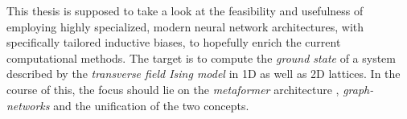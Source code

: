 This thesis is supposed to take a look at the feasibility and usefulness of employing highly specialized, modern neural network architectures, with specifically tailored inductive biases, to hopefully enrich the current computational methods. 
The target is to compute the \emph{ground state} of a system described by the \emph{transverse field Ising model} \cite*[]{transverseFieldIsingModel} in 1D as well as 2D lattices.
In the course of this, the focus should lie on the \emph{metaformer} architecture \cite*[]{metaformerPaper}, \emph{graph-networks}\cite*[]{relationalInductiveBiasesAndGraphNetworks} and the unification of the two concepts.
